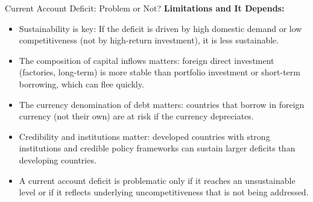 \documentclass[11pt, a4paper, twoside]{book}
\begin{document}
\begin{evaluation}{Current Account Deficit: Problem or Not?}
\textbf{Limitations and It Depends:}
\begin{itemize}
  \item Sustainability is key: If the deficit is driven by high domestic demand or low competitiveness (not by high-return investment), it is less sustainable.
  \item The composition of capital inflows matters: foreign direct investment (factories, long-term) is more stable than portfolio investment or short-term borrowing, which can flee quickly.
  \item The currency denomination of debt matters: countries that borrow in foreign currency (not their own) are at risk if the currency depreciates.
  \item Credibility and institutions matter: developed countries with strong institutions and credible policy frameworks can sustain larger deficits than developing countries.
  \item A current account deficit is problematic only if it reaches an unsustainable level or if it reflects underlying uncompetitiveness that is not being addressed.
\end{itemize}
\end{evaluation}
\end{document}
